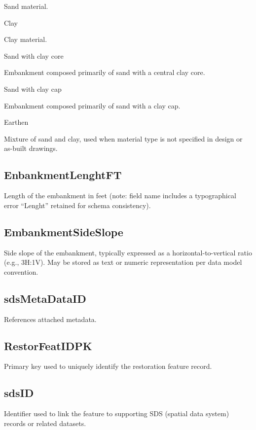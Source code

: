 \documentclass[
  letterpaper,
  DIV=11,
  numbers=noendperiod]{scrreprt}
\begin{document}
Sand material.

Clay

Clay material.

Sand with clay core

Embankment composed primarily of sand with a central clay core.

Sand with clay cap

Embankment composed primarily of sand with a clay cap.

Earthen

Mixture of sand and clay, used when material type is not specified in
design or as-built drawings.

\subsection{EnbankmentLenghtFT}\label{enbankmentlenghtft}

Length of the embankment in feet (note: field name includes a
typographical error ``Lenght'' retained for schema consistency).

\subsection{EmbankmentSideSlope}\label{embankmentsideslope}

Side slope of the embankment, typically expressed as a
horizontal-to-vertical ratio (e.g., 3H:1V). May be stored as text or
numeric representation per data model convention.

\subsection{sdsMetaDataID}\label{sdsmetadataid-1}

References attached metadata.

\subsection{RestorFeatIDPK}\label{restorfeatidpk-1}

Primary key used to uniquely identify the restoration feature record.

\subsection{sdsID}\label{sdsid-1}

Identifier used to link the feature to supporting SDS (spatial data
system) records or related datasets.
\end{document}
